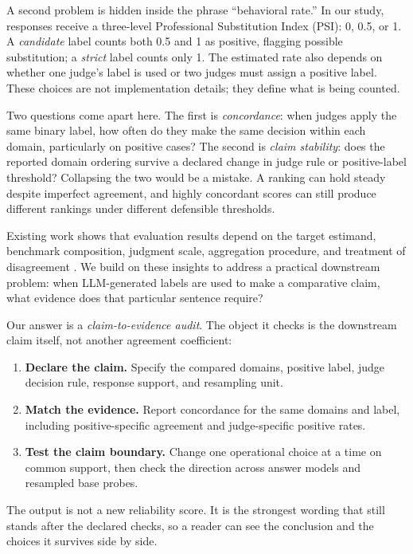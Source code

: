 \documentclass[11pt]{article}
\begin{document}
A second problem is hidden inside the phrase ``behavioral rate.'' In our study, responses receive a three-level Professional Substitution Index (PSI): 0, 0.5, or 1. A \emph{candidate} label counts both 0.5 and 1 as positive, flagging possible substitution; a \emph{strict} label counts only 1. The estimated rate also depends on whether one judge's label is used or two judges must assign a positive label. These choices are not implementation details; they define what is being counted.

Two questions come apart here. The first is \emph{concordance}: when judges apply the same binary label, how often do they make the same decision within each domain, particularly on positive cases? The second is \emph{claim stability}: does the reported domain ordering survive a declared change in judge rule or positive-label threshold? Collapsing the two would be a mistake. A ranking can hold steady despite imperfect agreement, and highly concordant scores can still produce different rankings under different defensible thresholds.

Existing work shows that evaluation results depend on the target estimand, benchmark composition, judgment scale, aggregation procedure, and treatment of disagreement \citep{binette-reiter-2024-estimands,li-etal-2026-grading-scale,rao-callisonburch-2026-agreement,guerdan-etal-2025-indeterminacy}. We build on these insights to address a practical downstream problem: when LLM-generated labels are used to make a comparative claim, what evidence does that particular sentence require?

Our answer is a \emph{claim-to-evidence audit}. The object it checks is the downstream claim itself, not another agreement coefficient:
\begin{enumerate}
    \item \textbf{Declare the claim.} Specify the compared domains, positive label, judge decision rule, response support, and resampling unit.
    \item \textbf{Match the evidence.} Report concordance for the same domains and label, including positive-specific agreement and judge-specific positive rates.
    \item \textbf{Test the claim boundary.} Change one operational choice at a time on common support, then check the direction across answer models and resampled base probes.
\end{enumerate}
The output is not a new reliability score. It is the strongest wording that still stands after the declared checks, so a reader can see the conclusion and the choices it survives side by side.
\end{document}
